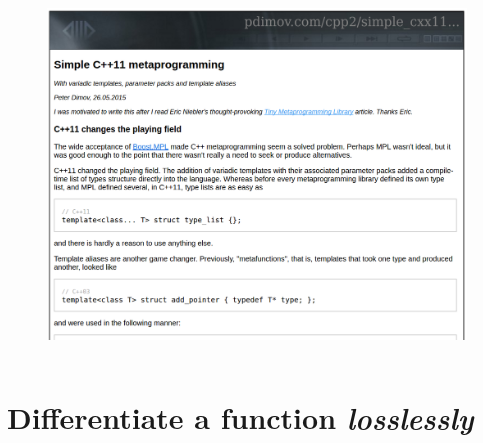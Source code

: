 \documentclass[xcolor=dvipsnames]{beamer}
\begin{document}
\begin{frame}[plain]
  \begin{columns}[T] %
    \begin{column}{0.9\textwidth}
      \begin{figure}[H]
        \centering
        \includegraphics[width=0.99\textwidth]{pdimov}
      \end{figure}
    \end{column}%
  \end{columns}
\end{frame}


\section{Differentiate a function \protect\textit{losslessly}}
\end{document}
